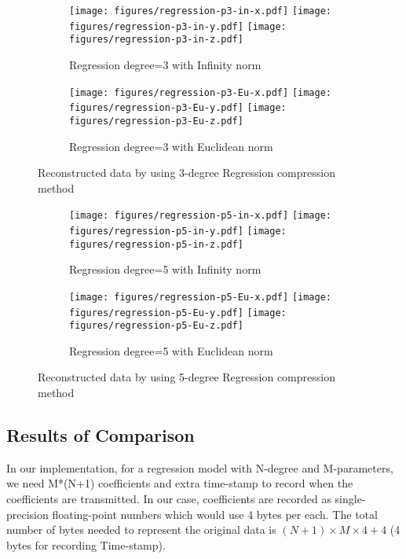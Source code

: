 \begin{figure*}
\centering
\begin{subfigure}{\columnwidth}
\centering
\texttt{[image: figures/regression-p3-in-x.pdf]}
\texttt{[image: figures/regression-p3-in-y.pdf]}
\texttt{[image: figures/regression-p3-in-z.pdf]}
\caption{Regression degree=3 with Infinity norm}
\end{subfigure}

\centering
\begin{subfigure}{\columnwidth}
\centering
\texttt{[image: figures/regression-p3-Eu-x.pdf]}
\texttt{[image: figures/regression-p3-Eu-y.pdf]}
\texttt{[image: figures/regression-p3-Eu-z.pdf]}
\caption{Regression degree=3 with Euclidean norm}
\end{subfigure}

\caption{Reconstructed data by using 3-degree Regression compression method}
\label{fig:poly-regression-3-degree}
\end{figure*}


\begin{figure*}
\centering
\begin{subfigure}{\columnwidth}
\centering
\texttt{[image: figures/regression-p5-in-x.pdf]}
\texttt{[image: figures/regression-p5-in-y.pdf]}
\texttt{[image: figures/regression-p5-in-z.pdf]}
\caption{Regression degree=5 with Infinity norm}
\end{subfigure}

\centering
\begin{subfigure}{\columnwidth}
\centering
\texttt{[image: figures/regression-p5-Eu-x.pdf]}
\texttt{[image: figures/regression-p5-Eu-y.pdf]}
\texttt{[image: figures/regression-p5-Eu-z.pdf]}
\caption{Regression degree=5 with Euclidean norm}
\end{subfigure}

\caption{Reconstructed data by using 5-degree Regression compression method}
\label{fig:poly-regression-5-degree}
\end{figure*}

\subsection{Results of Comparison}
In our implementation, for a regression model with N-degree and M-parameters, we
need M*(N+1) coefficients and extra time-stamp to record when the coefficients
are transmitted. In our case, coefficients are recorded as single-precision
floating-point numbers which would use 4 bytes per each. The total number of
bytes needed to represent the original data is $(N+1)\times M\times 4+4$ (4
bytes for recording Time-stamp).

